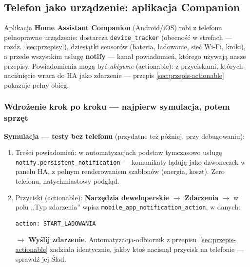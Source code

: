 \documentclass[11pt,a4paper]{article}
\begin{document}
\subsection{Telefon jako urządzenie: aplikacja Companion}
\label{sec:companion}

Aplikacja \textbf{Home Assistant Companion} (Android/iOS) robi z telefonu pełnoprawne urządzenie: dostarcza \texttt{device\_tracker} (obecność w strefach --- rozdz.~\ref{sec:przepisy}), dziesiątki sensorów (bateria, ładowanie, sieć Wi-Fi, kroki), a przede wszystkim usługę \textbf{notify} --- kanał powiadomień, którego używają nasze przepisy. Powiadomienia mogą być \emph{aktywne} (actionable): z przyciskami, których naciśnięcie wraca do HA jako zdarzenie --- przepis \ref{sec:przepis-actionable} pokazuje pełny obieg. 

\subsubsection{Wdrożenie krok po kroku --- najpierw symulacja, potem sprzęt}

\textbf{Symulacja --- testy bez telefonu} (przydatne też później, przy debugowaniu):
\begin{enumerate}
\item Treści powiadomień: w automatyzacjach podstaw tymczasowo usługę \texttt{notify.persistent\_notification} --- komunikaty lądują jako dzwoneczek w panelu HA, z pełnym renderowaniem szablonów (energia, koszt). Zero telefonu, natychmiastowy podgląd.
\item Przyciski (actionable): \textbf{Narzędzia deweloperskie $\to$ Zdarzenia} $\to$ w polu ,,Typ zdarzenia'' wpisz \texttt{mobile\_app\_notification\_action}, w danych:
\begin{lstlisting}
action: START_LADOWANIA
\end{lstlisting}
$\to$ \textbf{Wyślij zdarzenie}. Automatyzacja-odbiornik z przepisu~\ref{sec:przepis-actionable} zadziała identycznie, jakby ktoś nacisnął przycisk na telefonie --- sprawdź jej Ślad.
\end{enumerate}
\end{document}
